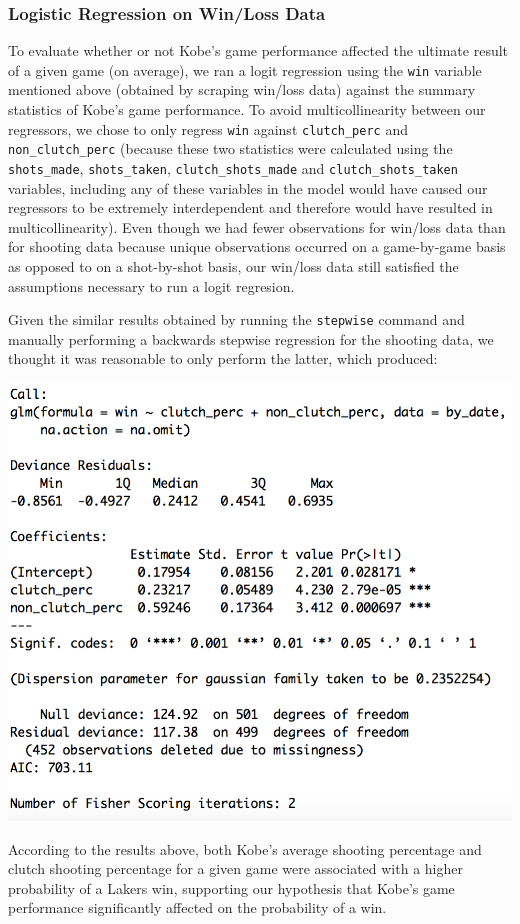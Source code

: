 \documentclass[paper=a4, fontsize=11pt]{scrartcl} %
\numberwithin{equation}{section} %
\numberwithin{figure}{section} %
\numberwithin{table}{section} %
\begin{document}
\subsubsection{Logistic Regression on Win/Loss Data}
\hspace*{1cm}To evaluate whether or not Kobe's game performance affected the ultimate result of a given game (on average), we ran a logit regression using the \texttt{win} variable mentioned above (obtained by scraping win/loss data) against the summary statistics of Kobe's game performance. To avoid multicollinearity between our regressors, we chose to only regress \texttt{win} against \texttt{clutch\_perc} and \texttt{non\_clutch\_perc} (because these two statistics were calculated using the \texttt{shots\_made}, \texttt{shots\_taken}, \texttt{clutch\_shots\_made} and \texttt{clutch\_shots\_taken} variables, including any of these variables in the model would have caused our regressors to be extremely interdependent and therefore would have resulted in multicollinearity). Even though we had fewer observations for win/loss data than for shooting data because unique observations occurred on a game-by-game basis as opposed to on a shot-by-shot basis, our win/loss data still satisfied the assumptions necessary to run a logit regresion. 

\hspace*{1cm}Given the similar results obtained by running the \texttt{stepwise} command and manually performing a backwards stepwise regression for the shooting data, we thought it was reasonable to only perform the latter, which produced:
\begin{center}
	\includegraphics[scale=0.6]{img/logitwins}
\end{center}
\hspace*{1cm}According to the results above, both Kobe's average shooting percentage and clutch shooting percentage for a given game were associated with a higher probability of a Lakers win, supporting our hypothesis that Kobe's game performance significantly affected on the probability of a win. 
\end{document}
